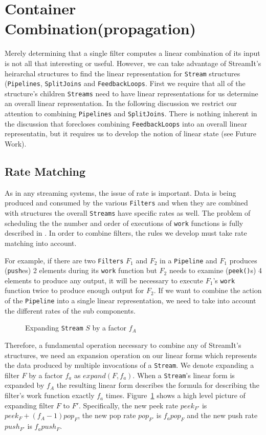 \section{Container Combination(propagation)}
Merely determining that a single filter computes a linear combination of its input is not
all that interesting or useful. However, we can take advantage of StreamIt's heirarchal 
structures to find the linear representation for {\tt Stream} structures ({\tt Pipelines},
{\tt SplitJoins} and {\tt FeedbackLoops}. First we require that all of the structure's 
children {\tt Streams} need to have linear representations for us determine an overall
linear representation. In the following discussion we restrict our attention to combining
{\tt Pipelines} and {\tt SplitJoins}. There is nothing inherent in the discussion that 
forecloses combining {\tt FeedbackLoops} into an overall linear representatin, but it
requires us to develop the notion of linear state (see Future Work).

\subsection{Rate Matching}

As in any streaming systems, the issue of rate is important. Data is being produced
and consumed by the various {\tt Filters} and when they are combined with structures
the overall {\tt Streams} have specific rates as well. The problem of scheduling the
the number and order of executions of {\tt work} functions is fully described in
\cite{karczma-thesis}. In order to combine filters, the rules we develop must take
rate matching into account. 

For example, if there are two
{\tt Filters} $F_1$ and $F_2$ in a {\tt Pipeline} and $F_1$ produces ({\tt push}es) 2 elements 
during its {\tt work} function but $F_2$ needs to examine ({\tt peek()}s) 4 elements 
to produce any output, it will be necessary to execute $F_1$'s {\tt work} function 
twice to produce enough output for $F_2$. If we want to combine the action of the 
{\tt Pipeline} into a single linear representation, we need to take into account
the different rates of the sub components.

\begin{figure}
\center
\epsfxsize=3.0in
\caption{Expanding {\tt Stream} $S$ by a factor $f_A$}
\label{fig:expanding-a-filter}
\end{figure}

Therefore, a fundamental operation necessary to combine any of StreamIt's structures, 
we need an expansion operation on our linear forms which represents the data produced
by multiple invocations of a {\tt Stream}. 
We denote expanding a filter $F$ by a factor $f_a$ as $expand(F, f_a)$.
When a {\tt Stream}'s linear form is expanded by $f_A$ 
the resulting linear form describes the formula for describing the filter's work
function exactly $f_a$ times. Figure~\ref{fig:expanding-a-filter} shows a 
high level picture of expanding filter $F$ to $F'$. Specifically, 
the new peek rate $peek_{F'}$ is  $peek_F + (f_A-1)pop_F$, the new pop rate
$pop_{F'}$ is  $f_{a}pop_F$ and the new push rate $push_{F'}$ is  $f_{a}push_F$.

